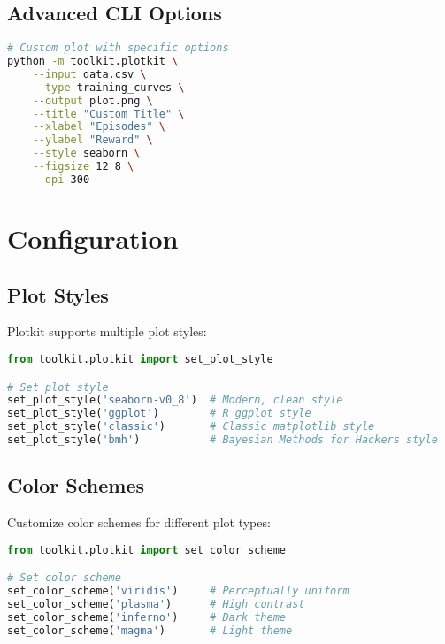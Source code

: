 \subsection{Advanced CLI Options}

\begin{lstlisting}[language=bash, caption=Advanced CLI Options]
# Custom plot with specific options
python -m toolkit.plotkit \
    --input data.csv \
    --type training_curves \
    --output plot.png \
    --title "Custom Title" \
    --xlabel "Episodes" \
    --ylabel "Reward" \
    --style seaborn \
    --figsize 12 8 \
    --dpi 300
\end{lstlisting}

\section{Configuration}

\subsection{Plot Styles}

Plotkit supports multiple plot styles:

\begin{lstlisting}[language=python, caption=Plot Style Configuration]
from toolkit.plotkit import set_plot_style

# Set plot style
set_plot_style('seaborn-v0_8')  # Modern, clean style
set_plot_style('ggplot')        # R ggplot style
set_plot_style('classic')       # Classic matplotlib style
set_plot_style('bmh')           # Bayesian Methods for Hackers style
\end{lstlisting}

\subsection{Color Schemes}

Customize color schemes for different plot types:

\begin{lstlisting}[language=python, caption=Color Scheme Configuration]
from toolkit.plotkit import set_color_scheme

# Set color scheme
set_color_scheme('viridis')     # Perceptually uniform
set_color_scheme('plasma')      # High contrast
set_color_scheme('inferno')     # Dark theme
set_color_scheme('magma')       # Light theme
\end{lstlisting}

